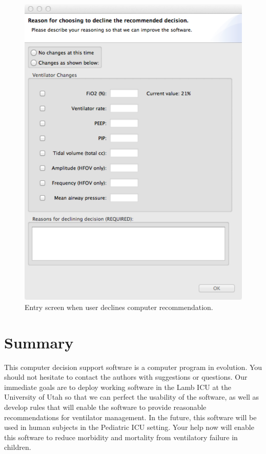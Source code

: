 \begin{figure}[htbp] 
   \centering
   \includegraphics[width=\textwidth]{DeclineDecision} 
   \caption{Entry screen when user declines computer recommendation.}
   \label{fig:decline}
\end{figure}
 
\section{Summary}
This computer decision support software is a computer program in evolution.  You should not hesitate
to contact the authors with suggestions or questions.  Our immediate goals are to deploy working software in
the Lamb ICU at the University of Utah so that we can perfect the usability of the software, as well as develop
rules that will enable the software to provide reasonable recommendations for ventilator management.  In the future,
this software will be used in human subjects in the Pediatric ICU setting.  Your help now will enable this software
to reduce morbidity and mortality from ventilatory failure in children.

\endinput